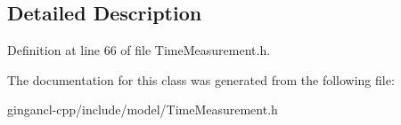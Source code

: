 \subsection{Detailed Description}




Definition at line 66 of file TimeMeasurement.h.

The documentation for this class was generated from the following file:\begin{CompactItemize}
\item 
gingancl-cpp/include/model/TimeMeasurement.h\end{CompactItemize}
